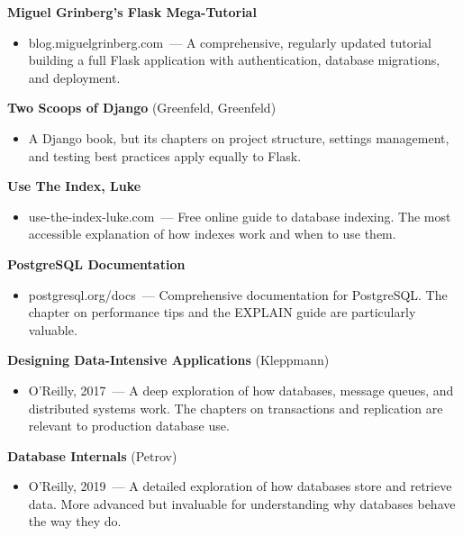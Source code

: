 \noindent{}\textbf{Miguel Grinberg's Flask Mega-Tutorial}

\begin{itemize}
\tightlist
\item
  blog.miguelgrinberg.com~--- A comprehensive, regularly updated tutorial building a full Flask application with authentication, database migrations, and deployment.
\end{itemize}

\noindent{}\textbf{Two Scoops of Django} (Greenfeld, Greenfeld)

\begin{itemize}
\tightlist
\item
  A Django book, but its chapters on project structure, settings management, and testing best practices apply equally to Flask.
\end{itemize}

\label{44-appendices:d2-databases-and-sql}

\textbf{Use The Index, Luke}

\begin{itemize}
\tightlist
\item
  use-the-index-luke.com~--- Free online guide to database indexing. The most accessible explanation of how indexes work and when to use them.
\end{itemize}

\noindent{}\textbf{PostgreSQL Documentation}

\begin{itemize}
\tightlist
\item
  postgresql.org/docs~--- Comprehensive documentation for PostgreSQL. The chapter on performance tips and the EXPLAIN guide are particularly valuable.
\end{itemize}

\noindent{}\textbf{Designing Data-Intensive Applications} (Kleppmann)

\begin{itemize}
\tightlist
\item
  O'Reilly, 2017~--- A deep exploration of how databases, message queues, and distributed systems work. The chapters on transactions and replication are relevant to production database use.
\end{itemize}

\noindent{}\textbf{Database Internals} (Petrov)

\begin{itemize}
\tightlist
\item
  O'Reilly, 2019~--- A detailed exploration of how databases store and retrieve data. More advanced but invaluable for understanding why databases behave the way they do.
\end{itemize}

